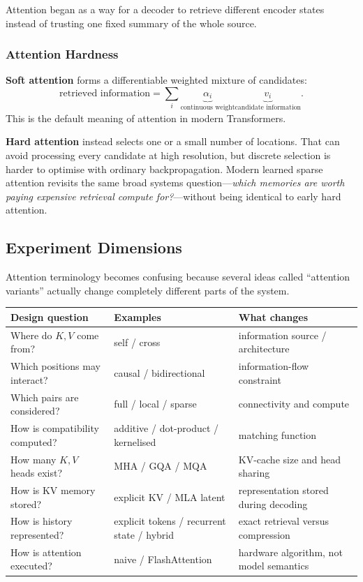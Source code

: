 \begin{calloutmemoryhook}
Attention began as a way for a decoder to retrieve different encoder states instead of trusting one fixed summary of the whole source.
\end{calloutmemoryhook}

\subsubsection{Attention Hardness}
\textbf{Soft attention} forms a differentiable weighted mixture of candidates:
\[
\text{retrieved information}
=
\sum_i
\underbrace{\alpha_i}_{\text{continuous weight}}
\underbrace{v_i}_{\text{candidate information}}.
\]
This is the default meaning of attention in modern Transformers.

\textbf{Hard attention} instead selects one or a small number of locations.
That can avoid processing every candidate at high resolution, but discrete selection is harder to optimise with ordinary backpropagation.
Modern learned sparse attention revisits the same broad systems question---\textit{which memories are worth paying expensive retrieval compute for?}---without being identical to early hard attention.

\subsection{Experiment Dimensions}
\label{sec:modern-attention-variants}
Attention terminology becomes confusing because several ideas called ``attention variants'' actually change completely different parts of the system.

\begin{center}
\small
\begin{tabularx}{.96\linewidth}{@{}L{.24\linewidth}L{.28\linewidth}Y@{}}
\toprule
\textbf{Design question} & \textbf{Examples} & \textbf{What changes} \\
\midrule
Where do $K,V$ come from? & self / cross & information source / architecture \\
Which positions may interact? & causal / bidirectional & information-flow constraint \\
Which pairs are considered? & full / local / sparse & connectivity and compute \\
How is compatibility computed? & additive / dot-product / kernelised & matching function \\
How many $K,V$ heads exist? & MHA / GQA / MQA & KV-cache size and head sharing \\
How is KV memory stored? & explicit KV / MLA latent & representation stored during decoding \\
How is history represented? & explicit tokens / recurrent state / hybrid & exact retrieval versus compression \\
How is attention executed? & naive / FlashAttention & hardware algorithm, not model semantics \\
\bottomrule
\end{tabularx}
\end{center}

